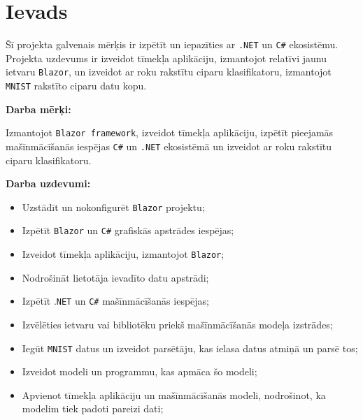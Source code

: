 \section{Ievads}

    Šī projekta galvenais mērķis ir izpētīt un iepazīties
    ar \texttt{.NET} un \texttt{C\#} ekosistēmu. Projekta uzdevums ir izveidot tīmekļa aplikāciju, izmantojot relatīvi
    jaunu ietvaru \texttt{Blazor}, un izveidot ar roku rakstītu ciparu klasifikatoru, izmantojot
    \texttt{MNIST} rakstīto ciparu datu kopu.

    \textbf{Darba mērķi:}

    Izmantojot \texttt{Blazor framework}, izveidot tīmekļa aplikāciju, izpētīt pieejamās mašīnmācīšanās
    iespējas \texttt{C\#} un \texttt{.NET} ekosistēmā un izveidot ar roku rakstītu ciparu klasifikatoru.

    \textbf{Darba uzdevumi:}

    \begin{itemize}
        \item Uzstādīt un nokonfigurēt \texttt{Blazor} projektu;
        \item Izpētīt \texttt{Blazor} un \texttt{C\#} grafiskās apstrādes iespējas;
        \item Izveidot tīmekļa aplikāciju, izmantojot \texttt{Blazor};
        \item Nodrošināt lietotāja ievadīto datu apstrādi;
        \item Izpētīt .\texttt{NET} un \texttt{C\#} mašīnmācīšanās iespējas;
        \item Izvēlēties ietvaru vai bibliotēku priekš mašīnmācīšanās modeļa izstrādes;
        \item Iegūt \texttt{MNIST} datus un izveidot parsētāju, kas ielasa datus atmiņā un parsē tos;
        \item Izveidot modeli un programmu, kas apmāca šo modeli;
        \item Apvienot tīmekļa aplikāciju un mašīnmācīšanās modeli, nodrošinot, ka modelim tiek padoti pareizi dati;
    \end{itemize}

